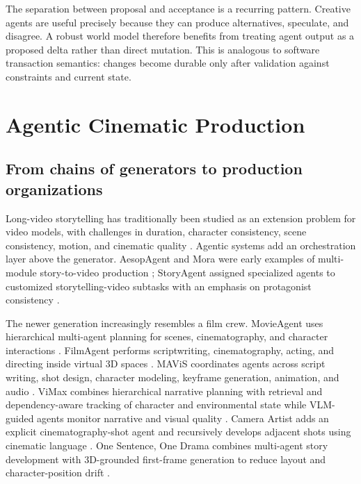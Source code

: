 \documentclass{article}
\begin{document}
The separation between proposal and acceptance is a recurring pattern. Creative agents are useful precisely because they can produce alternatives, speculate, and disagree. A robust world model therefore benefits from treating agent output as a proposed delta rather than direct mutation. This is analogous to software transaction semantics: changes become durable only after validation against constraints and current state.

\section{Agentic Cinematic Production}

\subsection{From chains of generators to production organizations}

Long-video storytelling has traditionally been studied as an extension problem for video models, with challenges in duration, character consistency, scene consistency, motion, and cinematic quality \citep{elmoghany2025longvideosurvey}. Agentic systems add an orchestration layer above the generator. AesopAgent and Mora were early examples of multi-module story-to-video production \citep{wang2024aesopagent,yuan2024mora}; StoryAgent assigned specialized agents to customized storytelling-video subtasks with an emphasis on protagonist consistency \citep{hu2024storyagent}.

The newer generation increasingly resembles a film crew. MovieAgent uses hierarchical multi-agent planning for scenes, cinematography, and character interactions \citep{wu2025movieagent}. FilmAgent performs scriptwriting, cinematography, acting, and directing inside virtual 3D spaces \citep{xu2025filmagent}. MAViS coordinates agents across script writing, shot design, character modeling, keyframe generation, animation, and audio \citep{wang2025mavis}. ViMax combines hierarchical narrative planning with retrieval and dependency-aware tracking of character and environmental state while VLM-guided agents monitor narrative and visual quality \citep{huang2026vimax}. Camera Artist adds an explicit cinematography-shot agent and recursively develops adjacent shots using cinematic language \citep{hu2026cameraartist}. One Sentence, One Drama combines multi-agent story development with 3D-grounded first-frame generation to reduce layout and character-position drift \citep{shi2026onedrama}.
\end{document}
